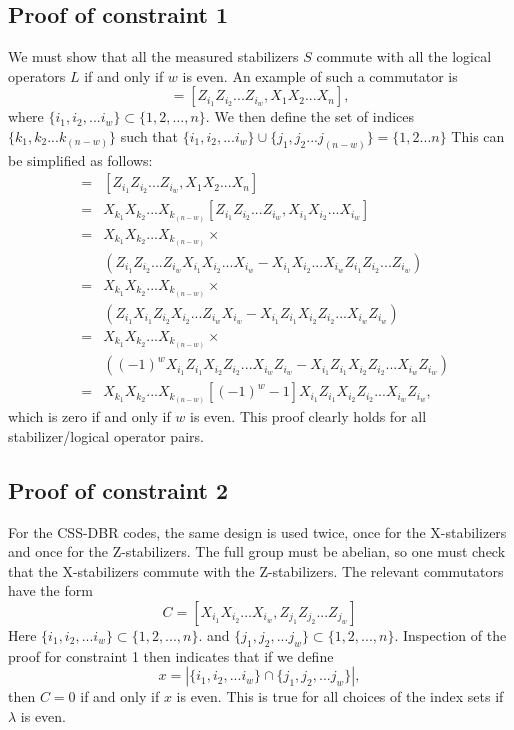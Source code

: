 \documentclass[superscriptaddress, notitlepage]{revtex4-1}
\begin{document}
\subsection{Proof of constraint 1}
We must show that all the measured stabilizers $S$ commute with all the logical operators $L$ if and only if $w$ is even.
An example of such a commutator is 
\begin{equation*}
[S,L] = [ Z_{i_1} Z_{i_2} ... Z_{i_w}, X_1 X_2... X_n ],
\end{equation*}
where $ \{i_1,i_2,...i_w \} \subset  \{1,2,...,n\}$.  We then define the set of indices $\{k_1,k_2...k_{(n-w)} \}$ such that 
$ \{i_1,i_2,...i_w \} \cup \{j_1,j_2...j_{(n-w)} \} = \{1,2...n\}$
This can be simplified as follows: 
\begin{eqnarray*}
	[S,L] 
	& = & [Z_{i_1} Z_{i_2} ... Z_{i_w}, X_1 X_2... X_n] \\
	& = & X_{k_1} X_{k_2}... X_{k_{(n-w)}} [Z_{i_1} Z_{i_2} ... Z_{i_w}, X_{i_1} X_{i_2}... X_{i_w}] \\
	& = &  X_{k_1} X_{k_2}... X_{k_{(n-w)}}  \times \\
	&  &  (Z_{i_1} Z_{i_2} ... Z_{i_w}X_{i_1} X_{i_2}... X_{i_w} -  X_{i_1} X_{i_2}... X_{i_w} Z_{i_1} Z_{i_2} ... Z_{i_w}) \\
	& = &  X_{k_1} X_{k_2}... X_{k_{(n-w)}} \times \\
	& &  (Z_{i_1} X_{i_1} Z_{i_2} X_{i_2} ... Z_{i_w}X_{i_w} -  X_{i_1} Z_{i_1} X_{i_2} Z_{i_2}... X_{i_w} Z_{i_w}) \\
	& = &  X_{k_1} X_{k_2}... X_{k_{(n-w)}} \times \\
	& &  ((-1)^w X_{i_1} Z_{i_1} X_{i_2} Z_{i_2} ... X_{i_w}Z_{i_w} -  X_{i_1} Z_{i_1} X_{i_2} Z_{i_2}... X_{i_w} Z_{i_w}) \\
	& = &  X_{k_1} X_{k_2}... X_{k_{(n-w)}} [ (-1)^w -1] X_{i_1} Z_{i_1} X_{i_2} Z_{i_2} ... X_{i_w}Z_{i_w},
\end{eqnarray*}
which is zero if and only if $w$ is even.  This proof clearly holds for all stabilizer/logical operator pairs.

\subsection{Proof of constraint 2}
For the CSS-DBR codes, the same design is used twice, once for the X-stabilizers and once for the Z-stabilizers.  The full group must be abelian, so one must check that the X-stabilizers commute with the Z-stabilizers. The relevant commutators have the form 
\begin{equation*}
C =  [ X_{i_1} X_{i_2} ... X_{i_w} , Z_{j_1} Z_{j_2} ... Z_{j_w} ] 
\end{equation*}
Here $ \{i_1,i_2,...i_w \} \subset  \{1,2,...,n\}$. and $ \{j_1,j_2,...j_w \} \subset  \{1,2,...,n\}$. Inspection of the proof for constraint 1 then indicates that if we define 
\begin{equation*}
x = | \{i_1,i_2,...i_w \} \cap \{j_1,j_2,...j_w \} |,
\end{equation*}
then $C=0$ if and only if $x$ is even.  This is true for all choices of the index sets if $\lambda$ is even.   
\end{document}
